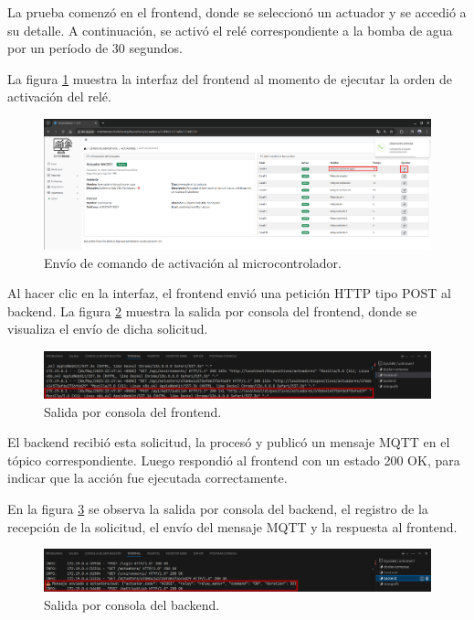 La prueba comenzó en el frontend, donde se seleccionó un actuador y se accedió
a su detalle. A continuación, se activó el relé correspondiente a la bomba de
agua por un período de 30 segundos.

La figura \ref{fig:prueba_integral_1} muestra la interfaz del frontend al
momento de ejecutar la orden de activación del relé.

\begin{figure}[H]
    \centering
    \includegraphics[width=\textwidth]{Images/59_prueba_integral_1.png}
    \caption[Envío de comando de activación al microcontrolador]{Envío de comando de activación al microcontrolador.}
    \label{fig:prueba_integral_1}
\end{figure}

Al hacer clic en la interfaz, el frontend envió una petición HTTP tipo POST al
backend. La figura \ref{fig:prueba_integral_2} muestra la salida por consola
del frontend, donde se visualiza el envío de dicha solicitud.

\begin{figure}[H]
    \centering
    \includegraphics[width=\textwidth]{Images/59_prueba_integral_2.png}
    \caption[Salida por consola del frontend]{Salida por consola del frontend.}
    \label{fig:prueba_integral_2}
\end{figure}

El backend recibió esta solicitud, la procesó y publicó un mensaje MQTT en el
tópico correspondiente. Luego respondió al frontend con un estado 200 OK, para
indicar que la acción fue ejecutada correctamente.

En la figura \ref{fig:prueba_integral_3} se observa la salida por consola del
backend, el registro de la recepción de la solicitud, el envío del mensaje MQTT
y la respuesta al frontend.

\begin{figure}[H]
    \centering
    \includegraphics[width=\textwidth]{Images/59_prueba_integral_3.png}
    \caption[Salida por consola del backend]{Salida por consola del backend.}
    \label{fig:prueba_integral_3}
\end{figure}

